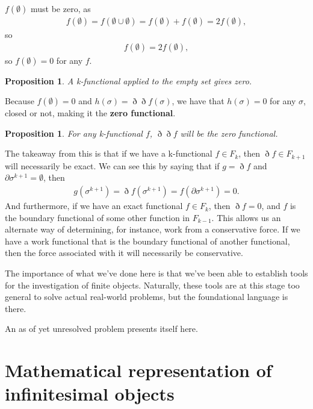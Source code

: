 \documentclass{book}
\newtheorem{prop}[equation]{Proposition}
\begin{document}
$f(\emptyset)$ must be zero, as \begin{gather} f(\emptyset) = f(\emptyset\cup\emptyset) = f(\emptyset) + f(\emptyset) = 2f(\emptyset),\end{gather} so \begin{gather} f(\emptyset) = 2f(\emptyset), \end{gather} so $f(\emptyset) = 0$ for any $f$. 

\begin{prop}
	A k-functional applied to the empty set gives zero. 
\end{prop}

Because $f(\emptyset) = 0$ and $h(\sigma) = \eth\eth f(\sigma)$, we have that $h(\sigma) = 0$ for any $\sigma$, closed or not, making it the \textbf{zero functional}.

\begin{prop}
	For any k-functional $f$, $\eth\eth f$ will be the zero functional. 
\end{prop}

The takeaway from this is that if we have a k-functional $f \in F_k$, then $\eth f \in F_{k+1}$ will necessarily be exact. We can see this by saying that if $g = \eth f$ and $\partial\sigma^{k+1} = \emptyset$, then \begin{gather} g(\sigma^{k+1}) = \eth f(\sigma^{k+1}) = f(\partial\sigma^{k+1}) = 0.\end{gather} And furthermore, if we have an exact functional $f \in F_k$, then $\eth f = 0$, and $f$ is the boundary functional of some other function in $F_{k-1}$. This allows us an alternate way of determining, for instance, work from a conservative force. If we have a work functional that is the boundary functional of another functional, then the force associated with it will necessarily be conservative.

The importance of what we've done here is that we've been able to establish tools for the investigation of finite objects. Naturally, these tools are at this stage too general to solve actual real-world problems, but the foundational language is there. 

An as of yet unresolved problem presents itself here. 







\chapter{Mathematical representation of infinitesimal objects}
\end{document}
